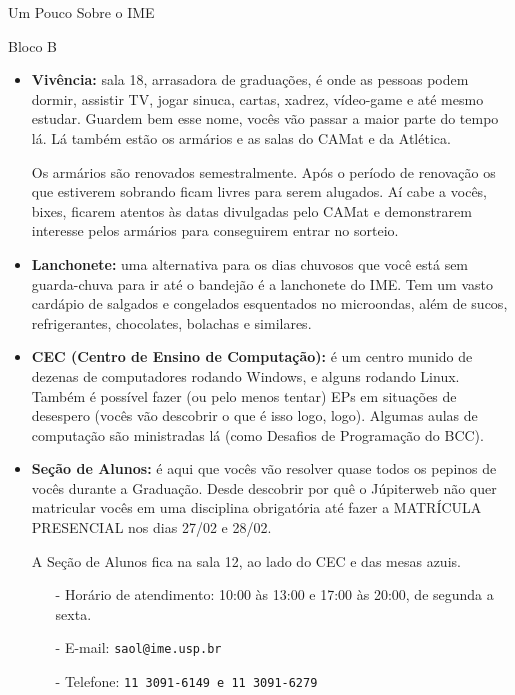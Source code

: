 \begin{secao}{Um Pouco Sobre o IME}
\begin{subsecao}{Bloco B}
\begin{itemize}
\item {\bf Vivência:} sala 18, arrasadora de graduações, é onde as pessoas podem
dormir, assistir TV, jogar sinuca, cartas, xadrez, vídeo-game e até
mesmo estudar. Guardem bem esse nome, vocês vão passar a maior parte do tempo lá.
Lá também estão os armários e as salas do CAMat e da Atlética.

Os armários são renovados semestralmente. Após o período de renovação os que
estiverem sobrando ficam livres para serem alugados. Aí cabe a vocês, bixes, ficarem
atentos às datas divulgadas pelo CAMat e demonstrarem interesse pelos armários para
conseguirem entrar no sorteio.

\item {\bf Lanchonete:} uma alternativa para os dias chuvosos que você está sem
  guarda-chuva para ir até o bandejão é a lanchonete do IME. Tem um vasto
  cardápio de salgados e congelados esquentados no microondas, além de sucos,
  refrigerantes, chocolates, bolachas e similares.

\end{itemize}




\begin{itemize}

\item {\bf CEC (Centro de Ensino de Computação):} é um centro munido de dezenas
de computadores rodando Windows, e alguns rodando Linux. Também é possível fazer
(ou pelo menos tentar) EPs em situações de desespero (vocês vão descobrir o que é
isso logo, logo). Algumas aulas de computação são ministradas lá (como Desafios
de Programação do BCC).

\item {\bf Seção de Alunos:} é aqui que vocês vão resolver quase todos os
pepinos de vocês durante a Graduação. Desde descobrir por quê o Júpiterweb não
quer matricular vocês em uma disciplina obrigatória até fazer a
MATRÍCULA PRESENCIAL nos dias 27/02 e 28/02. %

A Seção de Alunos fica na sala 12, ao lado do CEC e das mesas azuis.
\begin{itemize}
\item[-] Horário de atendimento: 10:00 às 13:00 e 17:00 às 20:00, de segunda a sexta.
\item[-] E-mail: \tt{saol@ime.usp.br}
\item[-] Telefone: \tt{11 3091-6149} e \tt{11 3091-6279}
\end{itemize}


\end{itemize}
\end{subsecao}
\end{secao}
